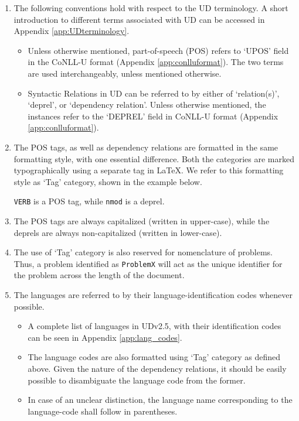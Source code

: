 \begin{enumerate}
    \item The following conventions hold with respect to the UD terminology. A short introduction to different terms associated with UD can be accessed in Appendix \ref{app:UDterminology}.
    \begin{itemize}
        \item Unless otherwise mentioned, part-of-speech (POS) refers to `UPOS' field in the CoNLL-U format (Appendix \ref{app:conlluformat}). The two terms are used interchangeably, unless mentioned otherwise.
        \item Syntactic Relations in UD can be referred to by either of `relation(s)', `deprel', or `dependency relation'. Unless otherwise mentioned, the instances refer to the `DEPREL' field in CoNLL-U format (Appendix \ref{app:conlluformat}).
    \end{itemize}
    
    \item The POS tags, as well as dependency relations are formatted in the same formatting style, with one essential difference. Both the categories are marked typographically using a separate tag in \LaTeX. We refer to this formatting style as `Tag' category, shown in the example below.
    
    \begin{example}
    \texttt{VERB} is a POS tag, while \texttt{nmod} is a deprel.
    \end{example}
    
    \item The POS tags are always capitalized (written in upper-case), while the deprels are always non-capitalized (written in lower-case).
    
    \item The use of `Tag' category is also reserved for nomenclature of problems. Thus, a problem identified as \verb|ProblemX| will act as the unique identifier for the problem across the length of the document.
    
    \item The languages are referred to by their language-identification codes whenever possible.
    \begin{itemize}
        \item A complete list of languages in UDv2.5, with their identification codes can be seen in Appendix \ref{app:lang_codes}.
        \item The language codes are also formatted using `Tag' category as defined above. Given the nature of the dependency relations, it should be easily possible to disambiguate the language code from the former.
        \item In case of an unclear distinction, the language name corresponding to the language-code shall follow in parentheses. 
    \end{itemize}
    

\end{enumerate}
